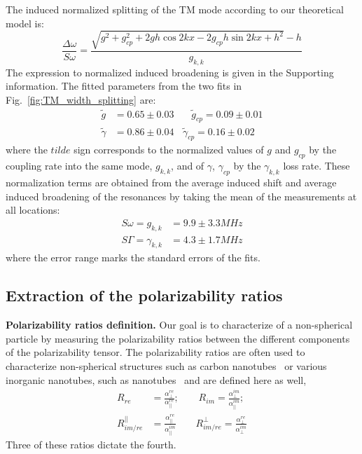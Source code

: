 \documentclass[journal=jacsat,manuscript=article]{achemso}
\begin{document}
The induced normalized splitting of the TM mode according to our theoretical model is:
\begin{equation}\label{eq:delta_omega_approxTM}
         \frac{\Delta \omega}{S\omega} = \frac{\sqrt{g^2 + g_{cp}^2 + 2 g h \cos{2 k x} - 2 g_{cp} h \sin{2 k x} + h^2}-h}{g_{k,k}}
\end{equation}
The expression to normalized induced broadening is given in the Supporting information.
The fitted parameters from the two fits in Fig.~\ref{fig:TM_width_splitting} are:
\begin{equation}\label{eq:fitting_parameters}
  \begin{split}
     \tilde{g} &= 0.65 \pm 0.03 ~~~~~~~~      \tilde g_{cp} = 0.09 \pm 0.01\\
       \tilde {\gamma}&= 0.86 \pm 0.04 ~~~~   \tilde{\gamma}_{cp} = 0.16 \pm 0.02
   \end{split}
\end{equation}
where the $tilde$ sign corresponds to the normalized values of $g$ and $g_{cp}$ by the coupling rate into the same mode, $g_{k,k}$, and of $\gamma$, $\gamma_{cp}$ by the $\gamma_{k,k}$ loss rate. These normalization terms are obtained from the average induced shift and average induced broadening of the resonances by taking the mean of the measurements at all locations:
\begin{equation}\label{eq:dc_parameters}
  \begin{split}
     \textit{S}\omega=g_{k,k} &= 9.9 \pm 3.3 MHz   \\
      \textit{S}\Gamma=\gamma_{k,k} & = 4.3 \pm 1.7 MHz
  \end{split}
\end{equation}
where the error range marks the standard errors of the fits.

\subsection{Extraction of the polarizability ratios}

\textbf{Polarizability ratios definition.} Our goal is to characterize of a non-spherical particle by measuring the polarizability ratios between the different components of the polarizability tensor. The polarizability ratios are often used to characterize non-spherical structures such as carbon nanotubes~\cite{rao2000polarized,reich2000comment,wang2004receiving} or various inorganic nanotubes, such as  nanotubes~\cite{tenne2005orientation,yang2008phototransistors} and are defined here as well,
\begin{equation}\label{ratio_definitions}
\begin{split}
   R_{re}  &= \frac{\alpha^{re}_{\perp}}{\alpha^{re}_{||}}; ~~~~~~~~~
    R_{im}  = \frac{\alpha^{im}_{\perp}}{\alpha^{im}_{||}}; \\
    R_{im/re}^{||}  &= \frac{\alpha^{re}_{||}}{\alpha^{im}_{||}} ~~~~~~~~~
    R_{im/re}^{\perp}  = \frac{\alpha^{re}_{\perp}}{\alpha^{im}_{\perp}}
\end{split}
\end{equation}
Three of these ratios dictate the fourth.
\end{document}
